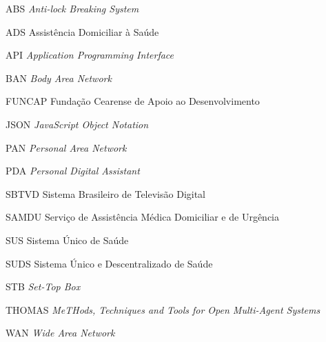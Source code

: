 \begin{siglas}
  \item[ABS] \textit{Anti-lock Breaking System}
  \item[ADS] Assistência Domiciliar à Saúde 
  \item[API] \textit{Application Programming Interface}
  \item[BAN] \textit{Body Area Network}
  \item[FUNCAP] Fundação Cearense de Apoio ao Desenvolvimento
  \item[JSON] \textit{JavaScript Object Notation}
  \item[PAN] \textit{Personal Area Network}
  \item[PDA] \textit{Personal Digital Assistant}
  \item[SBTVD] Sistema Brasileiro de Televisão Digital
  \item[SAMDU] Serviço de Assistência Médica Domiciliar e de Urgência 
  \item[SUS] Sistema Único de Saúde 
  \item[SUDS] Sistema Único e Descentralizado de Saúde 
  \item[STB] \textit{Set-Top Box}
  \item[THOMAS] \textit{MeTHods, Techniques and Tools for Open Multi-Agent Systems}
  \item[WAN] \textit{Wide Area Network}
\end{siglas}
